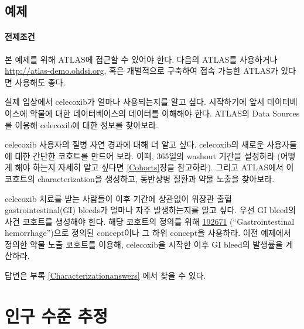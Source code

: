 \documentclass[11pt]{book}
\theoremstyle{definition}
\theoremstyle{definition}
\theoremstyle{definition}
\theoremstyle{remark}
\let\BeginKnitrBlock\begin \let\EndKnitrBlock\end
\begin{document}
\section{예제}\label{-6}

\subsubsection*{전제조건}\label{-4}

본 예제를 위해 ATLAS에 접근할 수 있어야 한다. 다음의 ATLAS를 사용하거나
\url{http://atlas-demo.ohdsi.org}, 혹은 개별적으로 구축하여 접속 가능한
ATLAS가 있다면 사용해도 좋다.

\BeginKnitrBlock{exercise}
\protect\hypertarget{exr:exerciseCharacterization1}{}{\label{exr:exerciseCharacterization1}
}실제 임상에서 celecoxib가 얼마나 사용되는지를 알고 싶다. 시작하기에
앞서 데이터베이스에 약물에 대한 데이터베이스의 데이터를 이해해야 한다.
ATLAS의 Data Sources를 이용해 celecoxib에 대한 정보를 찾아보라.
\EndKnitrBlock{exercise}

\BeginKnitrBlock{exercise}
\protect\hypertarget{exr:exerciseCharacterization2}{}{\label{exr:exerciseCharacterization2}
}celecoxib 사용자의 질병 자연 경과에 대해 더 알고 싶다. celecoxib의
새로운 사용자들에 대한 간단한 코호트를 만드어 보라. 이때, 365일의
washout 기간을 설정하라 (어떻게 해야 하는지 자세히 알고 싶다면
\ref{Cohorts}장을 참고하라). 그리고 ATLAS에서 이 코호트의
characterization을 생성하고, 동반상병 질환과 약물 노출을 찾아보라.
\EndKnitrBlock{exercise}

\BeginKnitrBlock{exercise}
\protect\hypertarget{exr:exerciseCharacterization3}{}{\label{exr:exerciseCharacterization3}
}celecoxib 치료를 받는 사람들이 이후 기간에 상관없이 위장관 출혈
gastrointestinal(GI) bleeds가 얼마나 자주 발생하는지를 알고 싶다. 우선
GI bleed의 사건 코호트를 생성해야 한다. 해당 코호트의 정의를 위해
\href{http://athena.ohdsi.org/search-terms/terms/192671}{192671}
(``Gastrointestinal hemorrhage'')으로 정의된 concept이나 그 하위
concept을 사용하라. 이전 예제에서 정의한 약물 노출 코호트를 이용해,
celecoxib을 시작한 이후 GI bleed의 발생률을 계산하라.
\EndKnitrBlock{exercise}

답변은 부록 \ref{Characterizationanswers} 에서 찾을 수 있다.

\chapter{인구 수준 추정}\label{PopulationLevelEstimation}
\end{document}
